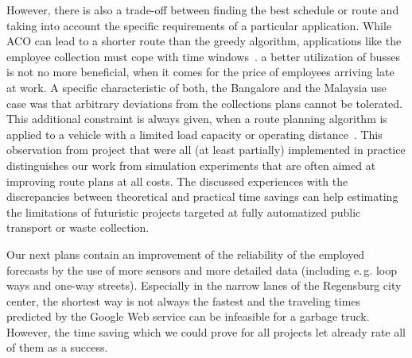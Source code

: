 \documentclass[10pt]{article}
\begin{document}
However, there is also a trade-off between finding the best schedule or route and taking into
account the specific requirements of a particular application. While ACO can lead to a shorter 
route than the greedy algorithm, applications like the employee collection must
cope with time windows~\cite{Kirci16}. a better utilization of busses is not no more 
beneficial, when it comes for the price of employees arriving late at work. A specific characteristic
of both, the Bangalore and the Malaysia use case was that arbitrary deviations from the  
collections plans cannot be tolerated. This additional constraint is always given,
when a route planning algorithm is applied to a vehicle with a limited load capacity
or operating distance~\cite{Wang17}.
This observation from project that were all (at least partially) implemented in 
practice distinguishes our work from simulation experiments that are often aimed
at improving route plans at all costs. The discussed experiences with the
discrepancies between theoretical and practical time savings can help
estimating the limitations of futuristic projects targeted at fully 
automatized public transport or waste collection.

Our next plans contain an improvement of the reliability of the employed 
forecasts by the use of more sensors and more detailed data (including e.\,g. 
loop ways and one-way streets). Especially in the narrow lanes of the 
Regensburg city center, the shortest way is not always the fastest and
the traveling times predicted by the Google Web service can be infeasible
for a garbage truck. However, the time saving which we could prove for all
projects let already rate all of them as a success.








\end{document}
